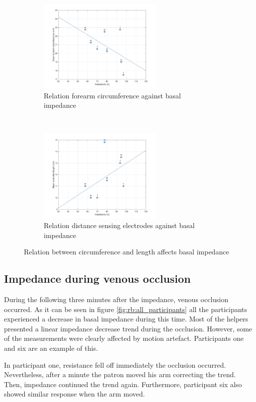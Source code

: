 \begin{figure}[t!]
	\centering
	\begin{subfigure}[t]{0.5\textwidth}
		\centering
		\includegraphics[height=4.5cm]{figure2a}
		\caption{Relation forearm circumference against basal impedance}
		\label{fig:C_vs_Z}
	\end{subfigure}%
	~ 
	\begin{subfigure}[t]{0.5\textwidth}
		\centering
		\includegraphics[height=4.5cm]{figure2b}
		\caption{Relation distance sensing electrodes against basal impedance}
		\label{fig:l_vs_Z}
	\end{subfigure}
	\caption{Relation between circumference and length affects basal impedance}
	\label{fig:relation_geometry_vs_impedance}
\end{figure}


\subsection{Impedance during venous occlusion}
\label{section5.1.2}
During the following three minutes after the impedance, venous occlusion occurred. As it can be seen in figure \ref{fig:rb:all_participants} all the participants experienced a decrease in basal impedance during this time. Most of the helpers presented a linear impedance decrease trend during the occlusion. However, some of the measurements were clearly affected by motion artefact. Participants one and six are an example of this. 

In participant one, resistance fell off immediately the occlusion occurred. Nevertheless, after a minute the patron moved his arm correcting the trend. Then, impedance continued the trend again. Furthermore,  participant six also showed similar response when the arm moved. 

